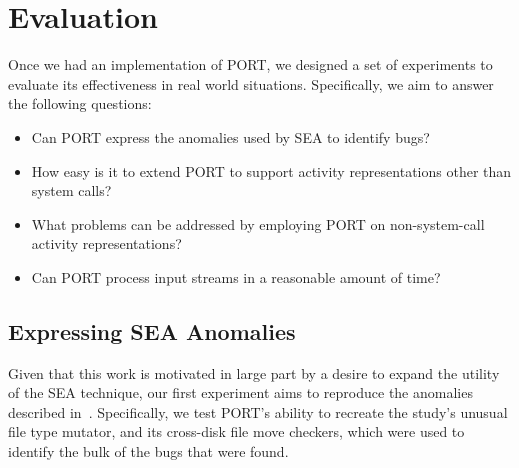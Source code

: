\section{Evaluation}
\label{SEC:evaluation}

Once we had an implementation of PORT, we designed a set of experiments to evaluate its  effectiveness in real world situations.
Specifically, we aim to answer the following questions:

\begin{itemize}

  \item{Can PORT express the anomalies used by SEA to identify bugs?}

  \item{How easy is it to extend PORT to support activity representations
    other than system calls?}

  \item{What problems can be addressed by employing PORT on
  non-system-call activity representations?}

  \item{Can PORT process input streams in a reasonable amount of time?}

\end{itemize}


\subsection{Expressing SEA Anomalies}
\label{sub:SEAAnomalies}
Given that this work is motivated
in large part
by a desire to expand the utility of the SEA technique,
our first experiment aims to reproduce the anomalies described
in~\cite{DBLP:conf/issre/MooreCFW19}.
Specifically,
we test PORT's ability to recreate
the study's unusual file type mutator,
and its cross-disk file move checkers, which were used to identify
the bulk of the bugs that were found.



